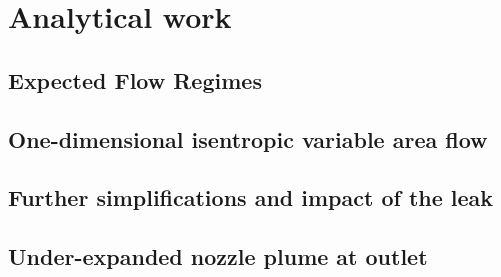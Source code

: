 \section{Analytical work}



\subsection{Expected Flow Regimes}

\newpage

\subsection{One-dimensional isentropic variable area flow}

\newpage

\subsection{Further simplifications and impact of the leak}

\newpage

\subsection{Under-expanded nozzle plume at outlet}

\newpage
